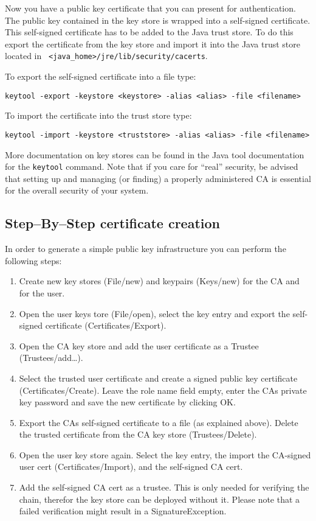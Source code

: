 Now you have a public key certificate that you can present for
authentication. The public key contained in the key store is wrapped
into a self-signed certificate. This self-signed certificate has to be
added to the Java trust store. To do this export the certificate from
the key store and import it into the Java trust store located in {\tt
<java\_home>/jre/lib/security/cacerts}.

To export the self-signed certificate into a file type:
\begin{verbatim}
keytool -export -keystore <keystore> -alias <alias> -file <filename>
\end{verbatim}
To import the certificate into the trust store type:
\begin{verbatim}
keytool -import -keystore <truststore> -alias <alias> -file <filename>
\end{verbatim}

More documentation on key stores  can be found in the Java tool
documentation for the {\tt keytool}  command. Note that if you care
for ``real'' security,  be advised  that setting  up  and managing
(or finding)  a properly administered CA is essential for the overall
security of your system.

\subsection{Step--By--Step certificate creation}
In  order to  generate  a  simple public  key  infrastructure you  can
perform the following steps:
\begin{enumerate}
\item Create new key stores (File/new) and keypairs (Keys/new) for the CA
and for the user.
\item  Open the  user keys tore (File/open),  select the  key  entry and
export the self-signed certificate (Certificates/Export).
\item  Open  the  CA  key store  and  add the  user  certificate  as  a
Trustee (Trustees/add\dots).
\item Select the  trusted user certificate and create  a signed public
key certificate (Certificates/Create). Leave the role name field empty,
enter the  CAs private  key password and  save the new  certificate by
clicking OK.
\item Export the  CAs self-signed certificate to a  file (as explained
above).    Delete    the    trusted    certificate   from    the    CA
key store (Trustees/Delete).
\item Open the  user key store again. Select the  key entry, the import
the CA-signed  user cert (Certificates/Import), and  the self-signed CA
cert.
\item Add  the self-signed CA cert  as a trustee. This  is only needed
for verifying the chain, therefor the key store can be deployed without
it.  Please  note  that  a  failed  verification  might  result  in  a
SignatureException.
\end{enumerate}

